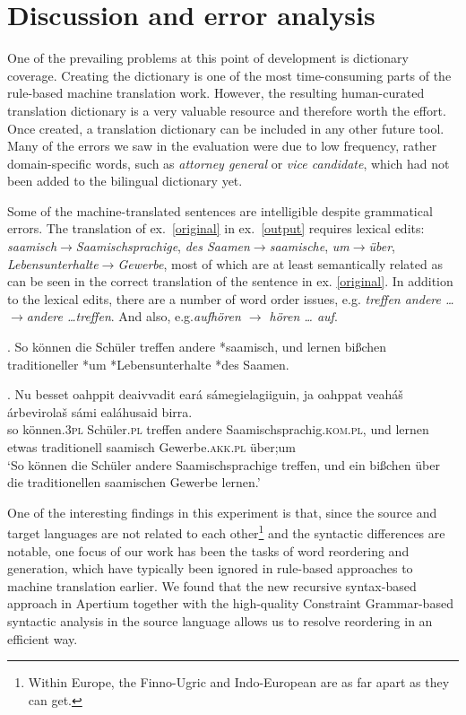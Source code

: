 \documentclass{flammie}
\begin{document}
\section{Discussion and error analysis}

One of the prevailing problems at this point of development is dictionary
coverage.  Creating the dictionary is one of the most time-consuming parts of
the rule-based machine translation work. However, the resulting human-curated
translation dictionary is a very valuable resource and therefore worth the
effort. Once created, a translation dictionary can be included in any other
future tool.  Many of the errors we saw in the evaluation were due to low
frequency, rather domain-specific words, such as \textit{attorney general} or
\textit{vice candidate}, which had not been added to the bilingual dictionary
yet.

Some of the machine-translated sentences are intelligible despite  grammatical
errors. The translation of ex.~\ref{original} in ex.~\ref{output} requires
lexical edits: \textit{saamisch$\rightarrow$Saamischsprachige}, \textit{des
Saamen$\rightarrow$saamische}, \textit{um$\rightarrow$über},
\textit{Lebensunterhalte$\rightarrow$Gewerbe}, most of which are at least
semantically related as can be seen in the correct translation of the sentence
in ex. \ref{original}. In addition to the lexical edits, there are a number of
word order issues, e.g.  \textit{treffen andere \ldots $\rightarrow$andere
\ldots treffen}.  And also, e.g.\textit{aufhören $\rightarrow$ hören \ldots
auf}.


\ex. So können die Schüler treffen andere *saamisch, und  lernen bißchen traditioneller *um *Lebensunterhalte *des Saamen.\label{output}



\exg. Nu besset oahppit deaivvadit eará sámegielagiiguin, ja oahppat veaháš árbevirolaš sámi ealáhusaid birra.\label{original}\\
so können\textsc{.3pl} Schüler\textsc{.pl} treffen andere Saamischsprachig\textsc{.kom.pl}, und lernen etwas traditionell saamisch Gewerbe\textsc{.akk.pl} über;um\\
`So können die Schüler andere Saamischsprachige treffen, und ein bißchen über die traditionellen saamischen Gewerbe lernen.'



One of the interesting findings in this experiment is that, since the source and
target languages are not related to each other\footnote{Within Europe, the
Finno-Ugric and Indo-European are as far apart as they can get.} and the
syntactic differences are notable, one focus of our work has been the tasks of
word reordering and generation, which have typically been ignored in rule-based
approaches to machine translation earlier.  We found that the new recursive
syntax-based approach in Apertium together with the high-quality Constraint
Grammar-based syntactic analysis in the source language allows us to resolve
reordering in an efficient way.
\end{document}
